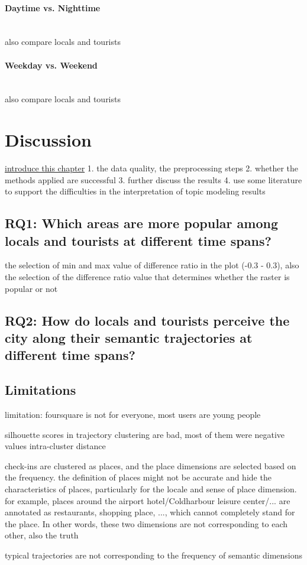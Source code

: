 \documentclass{article}
\newcommand{\subsubsubsection}[1]{\paragraph{#1}\mbox{}\\}
\theoremstyle{definition}
\theoremstyle{remark}
\begin{document}
\subsubsubsection{Daytime vs. Nighttime}
also compare locals and tourists

\subsubsubsection{Weekday vs. Weekend}
also compare locals and tourists


\clearpage


\section{Discussion}
\underline{introduce this chapter}
1. the data quality, the preprocessing steps
2. whether the methods applied are successful
3. further discuss the results
4. use some literature to support the difficulties in the interpretation of topic modeling results

\subsection{RQ1: Which areas are more popular among locals and tourists at different time spans?}
the selection of min and max value of difference ratio in the plot (-0.3 - 0.3), also the selection of the difference ratio value that determines whether the raster is popular or not

\subsection{RQ2: How do locals and tourists perceive the city along their semantic trajectories at different time spans?}

\subsection{Limitations}
limitation: foursquare is not for everyone, most users are young people

silhouette scores in trajectory clustering are bad, most of them were negative values
intra-cluster distance

check-ins are clustered as places, and the place dimensions are selected based on the frequency. the definition of places might not be accurate and hide the characteristics of places, particularly for the locale and sense of place dimension. for example, places around the airport hotel/Coldharbour leisure center/... are annotated as restaurants, shopping place, ..., which cannot completely stand for the place. In other words, these two dimensions are not corresponding to each other, also the truth

typical trajectories are not corresponding to the frequency of semantic dimensions
\end{document}
